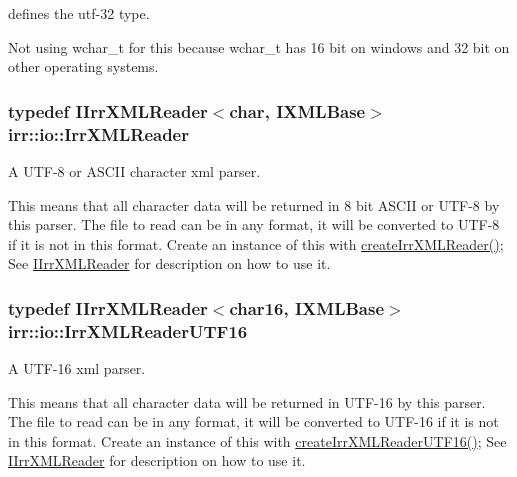 defines the utf-\/32 type. 

Not using wchar\+\_\+t for this because wchar\+\_\+t has 16 bit on windows and 32 bit on other operating systems. 
\subsubsection[{\texorpdfstring{Irr\+X\+M\+L\+Reader}{IrrXMLReader}}]{\setlength{\rightskip}{0pt plus 5cm}typedef {\bf I\+Irr\+X\+M\+L\+Reader}$<$char, {\bf I\+X\+M\+L\+Base}$>$ {\bf irr\+::io\+::\+Irr\+X\+M\+L\+Reader}}\hypertarget{namespaceirr_1_1io_a1628edbb9d5d53f18c82d2a92b0ad27e}{}\label{namespaceirr_1_1io_a1628edbb9d5d53f18c82d2a92b0ad27e}


A U\+T\+F-\/8 or A\+S\+C\+II character xml parser. 

This means that all character data will be returned in 8 bit A\+S\+C\+II or U\+T\+F-\/8 by this parser. The file to read can be in any format, it will be converted to U\+T\+F-\/8 if it is not in this format. Create an instance of this with \hyperlink{namespaceirr_1_1io_a581f4d4648398759c61266d63d7106b1}{create\+Irr\+X\+M\+L\+Reader()}; See \hyperlink{classirr_1_1io_1_1IIrrXMLReader}{I\+Irr\+X\+M\+L\+Reader} for description on how to use it. 
\subsubsection[{\texorpdfstring{Irr\+X\+M\+L\+Reader\+U\+T\+F16}{IrrXMLReaderUTF16}}]{\setlength{\rightskip}{0pt plus 5cm}typedef {\bf I\+Irr\+X\+M\+L\+Reader}$<${\bf char16}, {\bf I\+X\+M\+L\+Base}$>$ {\bf irr\+::io\+::\+Irr\+X\+M\+L\+Reader\+U\+T\+F16}}\hypertarget{namespaceirr_1_1io_a5eb4094dfd0d509e0cd8a9d1dd30a5b9}{}\label{namespaceirr_1_1io_a5eb4094dfd0d509e0cd8a9d1dd30a5b9}


A U\+T\+F-\/16 xml parser. 

This means that all character data will be returned in U\+T\+F-\/16 by this parser. The file to read can be in any format, it will be converted to U\+T\+F-\/16 if it is not in this format. Create an instance of this with \hyperlink{namespaceirr_1_1io_a86473ef152c15b685af181a4c5461a5d}{create\+Irr\+X\+M\+L\+Reader\+U\+T\+F16()}; See \hyperlink{classirr_1_1io_1_1IIrrXMLReader}{I\+Irr\+X\+M\+L\+Reader} for description on how to use it. 
